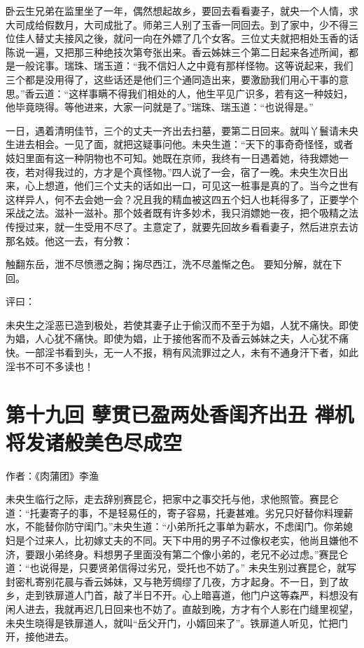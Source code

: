 \documentclass[a4paper,12pt,UTF8,twoside]{ctexbook}
\begin{document}
卧云生兄弟在监里坐了一年，偶然想起故乡，要回去看看妻子，就央一个人情，求大司成给假数月，大司成批了。师弟三人别了玉香一同回去。到了家中，少不得三位佳人替丈夫接风之後，就问一向在外嫖了几个女客。三位丈夫就把相处玉香的话陈说一遍，又把那三种绝技次第夸张出来。香云姊妹三个第二日起来各述所闻，都是一般诧事。瑞珠、瑞玉道：“我不信妇人之中竟有那样怪物。这等说起来，我们三个都是没用得了，这些话还是他们三个通同造出来，要激励我们用心干事的意思。”香云道：“这样事瞒不得我们相处的人，他生平见广识多，若有这一种妓妇，他毕竟晓得。等他进来，大家一问就是了。”瑞珠、瑞玉道：“也说得是。”

一日，遇着清明佳节，三个的丈夫一齐出去扫墓，要第二日回来。就叫丫鬟请未央生进去相会。一见了面，就把这疑事问他。未央生道：“天下的事奇奇怪怪，或者妓妇里面有这一种阴物也不可知。她既在京师，我终有一日遇着她，待我嫖她一夜，若对得我过的，方才是个真怪物。”四人说了一会，宿了一晚。未央生次日出来，心上想道，他们三个丈夫的话如出一口，可见这一桩事是真的了。当今之世有这样异人，何不去会她一会？况且我的精血被这四五个妇人也耗得多了，正要学个采战之法。滋补一滋补。那个妓者既有许多妙术，我只消嫖她一夜，把个吸精之法传授过来，就一生受用不尽了。主意定了，就要先回故乡看看妻子，然后进京去访那名妓。他这一去，有分教：

触翻东岳，泄不尽愤懑之胸；掬尽西江，洗不尽羞惭之色。
要知分解，就在下回。

评曰：

未央生之淫恶已造到极处，若使其妻子止于偷汉而不至于为娼，人犹不痛快。即使为娼，人心犹不痛快。即使为娼，止于接他客而不及香云姊妹之夫，人心犹不痛快。一部淫书看到头，无一人不报，稍有风流罪过之人，未有不通身汗下者，如此淫书不可不多读也！

\chapter{第十九回 孽贯已盈两处香闺齐出丑 禅机将发诸般美色尽成空}

作者：《肉蒲团》李渔

未央生临行之际，走去辞别赛昆仑，把家中之事交托与他，求他照管。赛昆仑道：“托妻寄子的事，不是轻易任的，寄子容易，托妻甚难。劣兄只好替你料理薪水，不能替你防守闺门。”未央生道：“小弟所托之事单为薪水，不虑闺门。你弟媳妇是个过来人，比初嫁丈夫的不同。天下中用的男子不过像权老实，他尚且嫌他不济，要跟小弟终身。料想男子里面没有第二个像小弟的，老兄不必过虑。”赛昆仑道：“也说得是，只要贤弟信得过劣兄，受托也不妨了。” 未央生别过赛昆仑，就写封密札寄别花晨与香云姊妹，又与艳芳绸缪了几夜，方才起身。不一日，到了故乡，走到铁扉道人门首，敲了半日不开。心上暗喜道，他门户这等森严，料想没有闲人进去，我就再迟几日回来也不妨了。直敲到晚，方才有个人影在门缝里视望，未央生晓得是铁扉道人，就叫“岳父开门，小婿回来了”。铁扉道人听见，忙把门开，接他进去。
\end{document}
